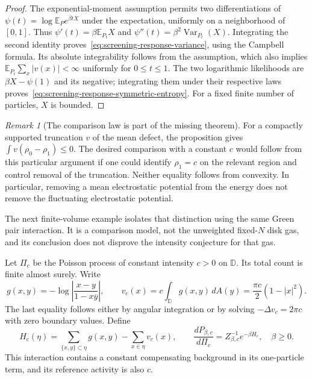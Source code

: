 \documentclass[11pt,a4paper]{article}
\numberwithin{equation}{section}
\theoremstyle{definition}
\theoremstyle{remark}
\newtheorem{remark}[theorem]{Remark}
\newcommand{\D}{\mathbb D}
\begin{document}
\begin{proof}
The exponential-moment assumption permits two differentiations of
$\psi(t)=\log\mathbb E_Pe^{\beta tX}$ under the expectation, uniformly
on a neighborhood of $[0,1]$.  Thus
$\psi'(t)=\beta\mathbb E_{P_t}X$ and
$\psi''(t)=\beta^2\operatorname{Var}_{P_t}(X)$.  Integrating the
second identity proves~\eqref{eq:screening-response-variance}, using
the Campbell formula.  Its absolute integrability follows from the
assumption, which also implies $\mathbb E_{P_t}\sum_x|v(x)|<\infty$
uniformly for $0\le t\le1$.  The two logarithmic likelihoods are
$\beta X-\psi(1)$ and its negative; integrating them under their
respective laws proves~\eqref{eq:screening-response-symmetric-entropy}.
For a fixed finite number of particles, $X$ is bounded.
\end{proof}

\begin{remark}[The comparison law is part of the missing theorem]
For a compactly supported truncation $v$ of the mean defect, the
proposition gives $\int v(\rho_0-\rho_1)\le0$.  The desired comparison
with a constant $c$ would follow from this particular argument if one
could identify $\rho_1=c$ on the relevant region and control removal
of the truncation.  Neither equality follows from convexity.  In
particular, removing a mean electrostatic potential from the energy
does not remove the fluctuating electrostatic potential.
\end{remark}

The next finite-volume example isolates that distinction using the
same Green pair interaction.  It is a comparison model, not the
unweighted fixed-$N$ disk gas, and its conclusion does not disprove the
intensity conjecture for that gas.

Let $\Pi_c$ be the Poisson process of constant intensity $c>0$ on
$\D$.  Its total count is finite almost surely.  Write
\[
 g(x,y)=-\log\left|\frac{x-y}{1-x\overline y}\right|,
 \qquad v_c(x)=c\int_\D g(x,y)\,dA(y)
             =\frac{\pi c}{2}(1-|x|^2).
\]
The last equality follows either by angular integration or by solving
$-\Delta v_c=2\pi c$ with zero boundary values.  Define
\begin{equation}
 H_c(\eta)=\sum_{\{x,y\}\subset\eta}g(x,y)
                  -\sum_{x\in\eta}v_c(x),\qquad
 \frac{dP_{\beta,c}}{d\Pi_c}
             =Z_{\beta,c}^{-1}e^{-\beta H_c},\quad\beta\ge0.
 \label{eq:screening-neutral-comparison-gas}
\end{equation}
This interaction contains a constant compensating background in its
one-particle term, and its reference activity is also $c$.
\end{document}
